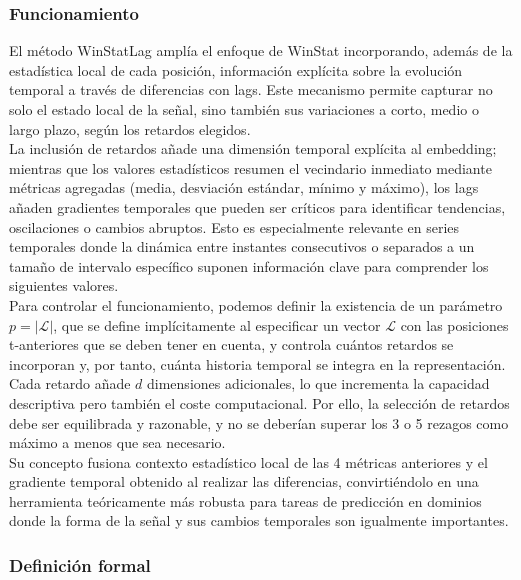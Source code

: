 \subsubsection{Funcionamiento}

El método WinStatLag amplía el enfoque de WinStat incorporando, además de la estadística local de cada posición, información explícita sobre la evolución temporal a través de diferencias con lags. Este mecanismo permite capturar no solo el estado local de la señal, sino también sus variaciones a corto, medio o largo plazo, según los retardos elegidos.\\

La inclusión de retardos añade una dimensión temporal explícita al embedding; mientras que los valores estadísticos resumen el vecindario inmediato mediante métricas agregadas (media, desviación estándar, mínimo y máximo), los lags añaden gradientes temporales que pueden ser críticos para identificar tendencias, oscilaciones o cambios abruptos. Esto es especialmente relevante en series temporales donde la dinámica entre instantes consecutivos  o separados a un tamaño de intervalo específico suponen información clave para comprender los siguientes valores.\\

Para controlar el funcionamiento, podemos definir la existencia de un parámetro $p = |\mathcal{L}|$, que se define implícitamente al especificar un vector $\mathcal{L}$ con las posiciones t-anteriores que se deben tener en cuenta, y controla cuántos retardos se incorporan y, por tanto, cuánta historia temporal se integra en la representación. Cada retardo añade $d$ dimensiones adicionales, lo que incrementa la capacidad descriptiva pero también el coste computacional. Por ello, la selección de retardos debe ser equilibrada y razonable, y no se deberían superar los 3 o 5 rezagos como máximo a menos que sea necesario.\\

Su concepto fusiona contexto estadístico local de las 4 métricas anteriores y el gradiente temporal obtenido al realizar las diferencias, convirtiéndolo en una herramienta teóricamente más robusta para tareas de predicción en dominios donde la forma de la señal y sus cambios temporales son igualmente importantes.

\subsubsection{Definición formal}

